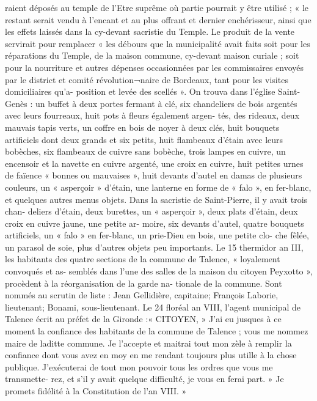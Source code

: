 \documentclass[a4paper,11pt]{book}
\begin{document}
raient déposés au temple de l'Etre suprême où partie
pourrait y être utilisé ; « le restant serait vendu à l'encant et
au plus offrant et dernier enchérisseur, ainsi que les effets
laissés dans la cy-devant sacristie du Temple. Le produit
de la vente servirait pour remplacer « les débours que la
municipalité avait faits soit pour les réparations du Temple,
de la maison commune, cy-devant maison curiale ; soit
pour la nourriture et autres dépenses occasionnées par les
commissaires envoyés par le district et comité révolution¬naire de Bordeaux, tant pour les visites domiciliaires qu'a-
position et levée des scellés ».
On trouva dans l'église Saint-Genès : un buffet à deux
portes fermant à clé, six chandeliers de bois argentés
avec leurs fourreaux, huit pots à fleurs également argen-
tés, des rideaux, deux mauvais tapis verts, un coffre en
bois de noyer à deux clés, huit bouquets artificiels dont
deux grands et six petits, huit flambeaux d'étain avec
leurs bobèches, six flambeaux de cuivre sans bobèche,
trois lampes en cuivre, un encensoir et la navette en cuivre
argenté, une croix en cuivre, huit petites urnes de faïence
« bonnes ou mauvaises », huit devants d'autel en damas
de plusieurs couleurs, un « asperçoir » d'étain, une lanterne
en forme de « falo », en fer-blanc, et quelques autres
menus objets.
Dans la sacristie de Saint-Pierre, il y avait trois chan-
deliers d'étain, deux burettes, un « asperçoir », deux
plats d'étain, deux croix en cuivre jaune, une petite ar-
moire, six devants d'autel, quatre bouquets artificiels, un
« falo » en fer-blanc, un prie-Dieu en bois, une petite clo-
che fêlée, un parasol de soie, plus d'autres objets peu
importants.
Le 15 thermidor an III, les habitants des quatre sections
de la commune de Talence, « loyalement convoqués et as-
semblés dans l'une des salles de la maison du citoyen
Peyxotto », procèdent à la réorganisation de la garde na-
tionale de la commune. Sont nommés au scrutin de liste :
Jean Gellidière, capitaine; François Laborie, lieutenant;
Bonami, sous-lieutenant.
Le 24 floréal an VIII, l'agent municipal de Talence écrit
au préfet de la Gironde :« CITOYEN,
»
J'ai eu jusques à ce moment la confiance des habitants
de la commune de Talence ; vous me nommez maire de
laditte commune. Je l'accepte et maitrai tout mon zèle à
remplir la confiance dont vous avez en moy en me rendant
toujours plus utille à la chose publique. J'exécuterai de
tout mon pouvoir tous les ordres que vous me transmette-
rez, et s'il y avait quelque difficulté, je vous en ferai part.
» Je promets fidélité à la Constitution de l'an VIII. »
\end{document}
